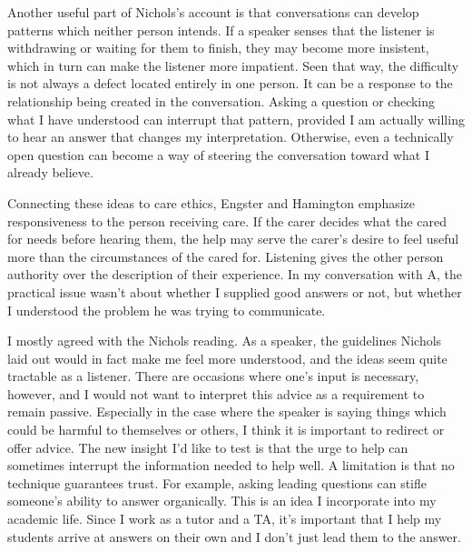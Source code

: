 \documentclass[12pt,stu,biblatex]{apa7}
\begin{document}
Another useful part of Nichols's account is that conversations can develop patterns which neither person intends.
If a speaker senses that the listener is withdrawing or waiting for them to finish, they may become more insistent, which in turn can make the listener more impatient.
Seen that way, the difficulty is not always a defect located entirely in one person.
It can be a response to the relationship being created in the conversation.
Asking a question or checking what I have understood can interrupt that pattern, provided I am actually willing to hear an answer that changes my interpretation.
Otherwise, even a technically open question can become a way of steering the conversation toward what I already believe.

Connecting these ideas to care ethics, Engster and Hamington \parencite{engsterHamington2015introduction} emphasize responsiveness to the person receiving care.
If the carer decides what the cared for needs before hearing them, the help may serve the carer's desire to feel useful more than the circumstances of the cared for.
Listening gives the other person authority over the description of their experience.
In my conversation with A, the practical issue wasn't about whether I supplied good answers or not, but whether I understood the problem he was trying to communicate.

I mostly agreed with the Nichols reading.
As a speaker, the guidelines Nichols laid out would in fact make me feel more understood, and the ideas seem quite tractable as a listener.
There are occasions where one's input is necessary, however, and I would not want to interpret this advice as a requirement to remain passive.
Especially in the case where the speaker is saying things which could be harmful to themselves or others, I think it is important to redirect or offer advice.
The new insight I'd like to test is that the urge to help can sometimes interrupt the information needed to help well.
A limitation is that no technique guarantees trust.
For example, asking leading questions can stifle someone's ability to answer organically.
This is an idea I incorporate into my academic life.
Since I work as a tutor and a TA, it's important that I help my students arrive at answers on their own and I don't just lead them to the answer.
\end{document}
